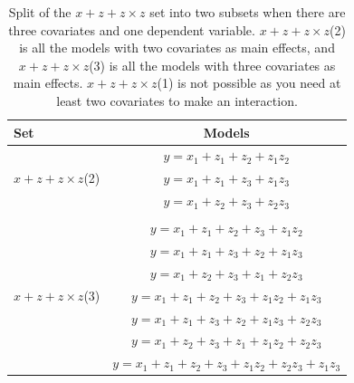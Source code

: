 

\begin{table}
\centering
\caption{Split of the $x + z + z \times z$ set into two subsets when there are three covariates and one dependent variable. $x + z + z \times z$(2) is all the models with two covariates as main effects, and $x + z + z \times z$(3) is all the models with three covariates as main effects. $x + z + z \times z$(1) is not possible as you need at least two covariates to make an interaction.}
\label{tab:appmodel4}
\begin{tabular}{lc} 
\toprule
Set & Models \\ 
\midrule
\multirow{3}{*}{$x + z + z \times z$(2)} & $y=x_1+z_1+z_2+z_1z_2$\\ & $y=x_1+z_1+z_3+z_1z_3$\\ & $y=x_1+z_2+z_3+z_2z_3$\\ &  \\  
\multirow{7}{*}{$x + z + z \times z$(3)} & $y=x_1+z_1+z_2+z_3+z_1z_2$\\ & $y=x_1+z_1+z_3+z_2+z_1z_3$\\ & $y=x_1+z_2+z_3+z_1+z_2z_3$\\ & $y=x_1+z_1+z_2+z_3+z_1z_2+z_1z_3$\\ & $y=x_1+z_1+z_3+z_2+z_1z_3+z_2z_3$\\ & $y=x_1+z_2+z_3+z_1+z_1z_2+z_2z_3$\\ & $y=x_1+z_1+z_2+z_3+z_1z_2+z_2z_3+z_1z_3$\\ 
\bottomrule
\end{tabular}
\end{table}

